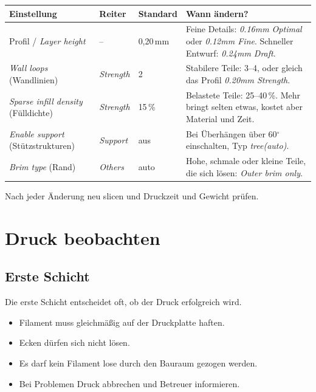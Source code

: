 \documentclass{\basedir/fablab-document}
\begin{document}
	\begin{center}
		\small
		\renewcommand{\arraystretch}{1.3}
		\begin{tabularx}{\textwidth}{|l|l|l|X|}
			\hline
			\textbf{Einstellung} & \textbf{Reiter} & \textbf{Standard} & \textbf{Wann ändern?} \\ \hline
			Profil / \textit{Layer height} & -- & 0,20\,mm & Feine Details: \textit{0.16mm Optimal} oder \textit{0.12mm Fine}. Schneller Entwurf: \textit{0.24mm Draft}. \\ \hline
			\textit{Wall loops} (Wandlinien) & \textit{Strength} & 2 & Stabilere Teile: 3--4, oder gleich das Profil \textit{0.20mm Strength}. \\ \hline
			\textit{Sparse infill density} (Fülldichte) & \textit{Strength} & 15\,\% & Belastete Teile: 25--40\,\%. Mehr bringt selten etwas, kostet aber Material und Zeit. \\ \hline
			\textit{Enable support} (Stützstrukturen) & \textit{Support} & aus & Bei Überhängen über 60$^\circ$ einschalten, Typ \textit{tree(auto)}. \\ \hline
			\textit{Brim type} (Rand) & \textit{Others} & auto & Hohe, schmale oder kleine Teile, die sich lösen: \textit{Outer brim only}. \\ \hline
		\end{tabularx}
	\end{center}
	
	Nach jeder Änderung neu slicen und Druckzeit und Gewicht prüfen.
	
	\section{Druck beobachten}
	
	\subsection{Erste Schicht}
	
	Die erste Schicht entscheidet oft, ob der Druck erfolgreich wird.
	
	\begin{itemize}
		\item Filament muss gleichmäßig auf der Druckplatte haften.
		\item Ecken dürfen sich nicht lösen.
		\item Es darf kein Filament lose durch den Bauraum gezogen werden.
		\item Bei Problemen Druck abbrechen und Betreuer informieren.
	\end{itemize}
	
\end{document}
